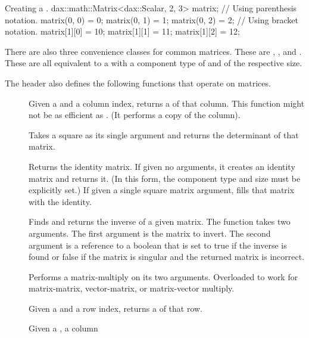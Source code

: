 \begin{daxexample}{Creating a .}
dax::math::Matrix<dax::Scalar, 2, 3> matrix;
// Using parenthesis notation.
matrix(0, 0) = 0;
matrix(0, 1) = 1;
matrix(0, 2) = 2;
// Using bracket notation.
matrix[1][0] = 10;
matrix[1][1] = 11;
matrix[1][2] = 12;
\end{daxexample}

There are also three convenience classes for common matrices. These are
, , and . These
are all equivalent to a  with a component type of
 and of the respective size.

The  header also defines the following
functions that operate on matrices.

\begin{description}
\item[]  Given a 
  and a column index, returns a  of that column. This function
  might not be as efficient as . (It performs a copy of
  the column).
\item[]  Takes a square
   as its single argument and returns the
  determinant of that matrix.
\item[]  Returns the
  identity matrix. If given no arguments, it creates an identity matrix and
  returns it. (In this form, the component type and size must be explicitly
  set.) If given a single square matrix argument, fills that matrix with
  the identity.
\item[]  Finds and returns the
  inverse of a given matrix. The function takes two arguments. The first
  argument is the matrix to invert. The second argument is a reference to a
  boolean that is set to true if the inverse is found or false if the
  matrix is singular and the returned matrix is incorrect.
\item[] Performs a matrix-multiply on its two
  arguments. Overloaded to work for matrix-matrix, vector-matrix, or
  matrix-vector multiply.
\item[]  Given a  and a
  row index, returns a  of that row.
\item[] Given a , a column

\end{description}
